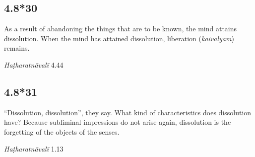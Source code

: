 \begin{ekdosis}

\subsection*{4.8*30}
\begin{translation}[hp04_008_30]
As a result of abandoning the things that are to be known, the mind attains dissolution. When the mind has attained dissolution, liberation (\textit{kaivalyam}) remains.
\end{translation} %


\begin{testimonia}[hp04_008_30]
\emph{Haṭharatnāvalī} 4.44
\begin{versinnote}
\end{versinnote}
\end{testimonia}


\subsection*{4.8*31}
\begin{translation}[hp04_008_31]
“Dissolution, dissolution”, they say. What kind of characteristics does dissolution have? Because subliminal impressions do not arise again, dissolution is the forgetting of the objects of the senses.
\end{translation}


\begin{testimonia}[hp04_008_31]
\emph{Haṭharatnāvalī} 1.13
\begin{versinnote}
\end{versinnote}


\end{testimonia}
\end{ekdosis}
